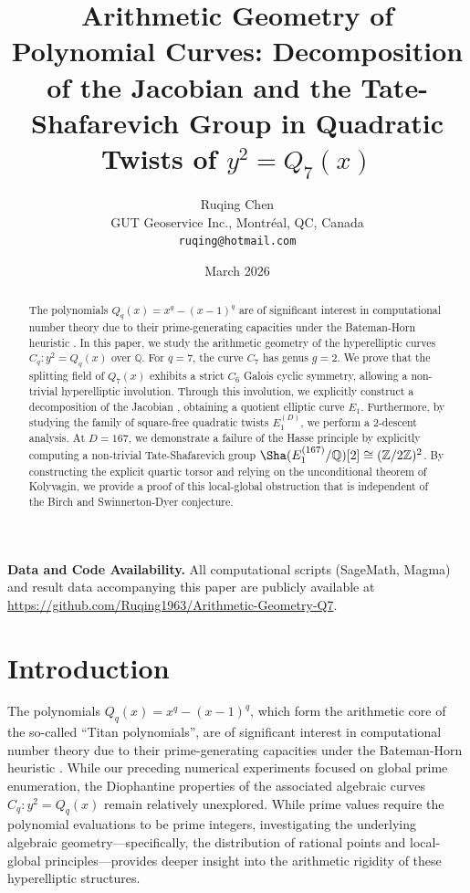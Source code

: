 \documentclass[11pt,a4paper]{article}
\title{Arithmetic Geometry of Polynomial Curves: Decomposition of the Jacobian and the Tate-Shafarevich Group in Quadratic Twists of $y^2 = Q_7(x)$}
\author{
    Ruqing Chen \\
    GUT Geoservice Inc., Montr\'{e}al, QC, Canada \\
    \texttt{ruqing@hotmail.com}
}
\date{March 2026}
\newcommand{\githubrepo}{\url{https://github.com/Ruqing1963/Arithmetic-Geometry-Q7}}
\begin{document}
\maketitle

\begin{abstract}
The polynomials $Q_q(x) = x^q - (x-1)^q$ are of significant interest in computational number theory due to their prime-generating capacities under the Bateman-Horn heuristic \cite{BatemanHorn}. In this paper, we study the arithmetic geometry of the hyperelliptic curves $C_q: y^2 = Q_q(x)$ over $\mathbb{Q}$. For $q=7$, the curve $C_7$ has genus $g=2$. We prove that the splitting field of $Q_7(x)$ exhibits a strict $C_6$ Galois cyclic symmetry, allowing a non-trivial hyperelliptic involution. Through this involution, we explicitly construct a decomposition of the Jacobian \cite{CasselsFlynn}, obtaining a quotient elliptic curve $E_1$. Furthermore, by studying the family of square-free quadratic twists $E_1^{(D)}$, we perform a 2-descent analysis. At $D=167$, we demonstrate a failure of the Hasse principle by explicitly computing a non-trivial Tate-Shafarevich group $\Sha(E_1^{(167)}/\mathbb{Q})[2] \cong (\mathbb{Z}/2\mathbb{Z})^2$. By constructing the explicit quartic torsor and relying on the unconditional theorem of Kolyvagin, we provide a proof of this local-global obstruction that is independent of the Birch and Swinnerton-Dyer conjecture.
\end{abstract}

\smallskip
\noindent\textbf{Data and Code Availability.} All computational scripts (SageMath, Magma) and result data accompanying this paper are publicly available at \githubrepo.

\section{Introduction}

The polynomials $Q_q(x) = x^q - (x-1)^q$, which form the arithmetic core of the so-called ``Titan polynomials'', are of significant interest in computational number theory due to their prime-generating capacities under the Bateman-Horn heuristic \cite{BatemanHorn}. While our preceding numerical experiments focused on global prime enumeration, the Diophantine properties of the associated algebraic curves $C_q: y^2 = Q_q(x)$ remain relatively unexplored. While prime values require the polynomial evaluations to be prime integers, investigating the underlying algebraic geometry—specifically, the distribution of rational points and local-global principles—provides deeper insight into the arithmetic rigidity of these hyperelliptic structures.
\end{document}
